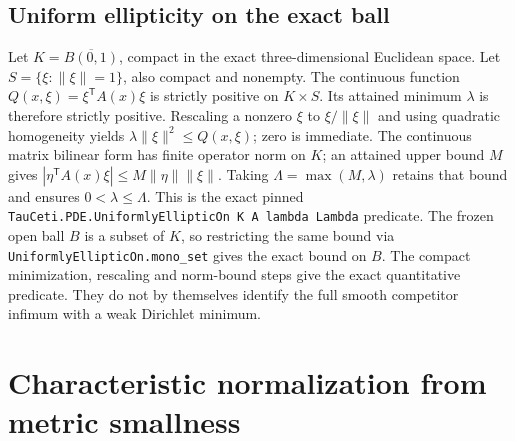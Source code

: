 \documentclass[11pt]{article}
\theoremstyle{definition}
\theoremstyle{remark}
\numberwithin{equation}{section}
\begin{document}
\subsection{Uniform ellipticity on the exact ball}\label{metric-coefficient:uniform}
Let $K=\overline{B(0,1)}$, compact in the exact three-dimensional Euclidean
space. Let $S=\{\xi:\|\xi\|=1\}$, also compact and nonempty. The continuous
function $Q(x,\xi)=\xi^\mathsf T A(x)\xi$ is strictly positive on $K\times S$.
Its attained minimum $\lambda$ is therefore strictly positive. Rescaling a
nonzero $\xi$ to $\xi/\|\xi\|$ and using quadratic homogeneity yields
$\lambda\|\xi\|^2\le Q(x,\xi)$; zero is immediate.
The continuous matrix bilinear form has finite operator norm on $K$; an
attained upper bound $M$ gives
$|\eta^\mathsf T A(x)\xi|\le M\|\eta\|\|\xi\|$. Taking
$\Lambda=\max(M,\lambda)$ retains that bound and ensures
$0<\lambda\le\Lambda$. This is the exact pinned
\texttt{TauCeti.PDE.UniformlyEllipticOn K A lambda Lambda} predicate.
The frozen open ball $B$ is a subset of $K$, so restricting the same bound
via \texttt{UniformlyEllipticOn.mono\_set} gives the exact bound on $B$.
The compact minimization, rescaling and norm-bound steps give the exact quantitative predicate. They do not by themselves identify the full smooth competitor infimum with a weak Dirichlet minimum.

\clearpage


\section{Characteristic normalization from metric smallness}\label{metric-characteristic:equations}
\end{document}
